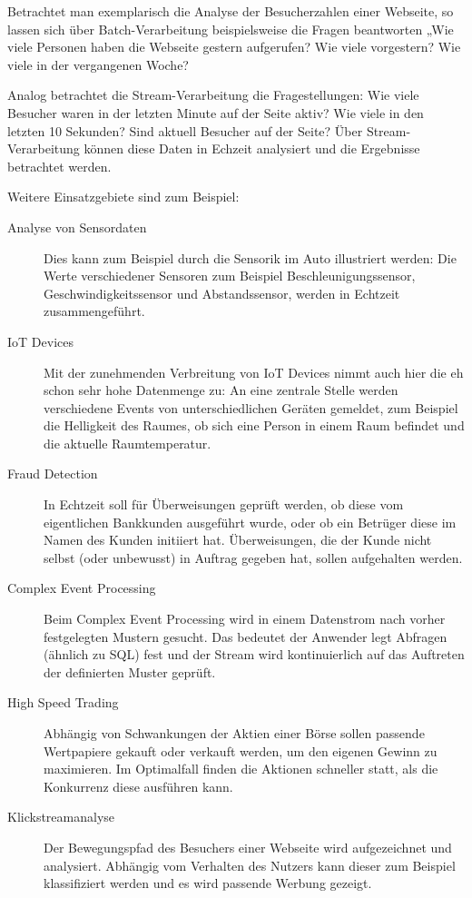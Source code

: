 \documentclass[a4paper,11pt]{scrartcl}
\begin{document}
Betrachtet man exemplarisch die Analyse der Besucherzahlen einer Webseite, so
lassen sich über Batch-Verarbeitung beispielsweise die Fragen beantworten „Wie
viele Personen haben die Webseite gestern aufgerufen? Wie viele vorgestern?
Wie viele in der vergangenen Woche?

Analog betrachtet die Stream-Verarbeitung die Fragestellungen: Wie viele
Besucher waren in der letzten Minute auf der Seite aktiv? Wie viele in den
letzten 10 Sekunden? Sind aktuell Besucher auf der Seite? Über
Stream-Verarbeitung können diese Daten in Echzeit analysiert und die Ergebnisse
betrachtet werden.

Weitere Einsatzgebiete sind zum Beispiel:
\begin{description}
  \item[Analyse von Sensordaten] Dies kann zum Beispiel durch die Sensorik im
    Auto illustriert werden: Die Werte verschiedener Sensoren zum Beispiel
    Beschleunigungssensor, Geschwindigkeitssensor und Abstandssensor, werden in
    Echtzeit zusammengeführt.
  \item[IoT Devices] Mit der zunehmenden Verbreitung von IoT Devices nimmt auch
    hier die eh schon sehr hohe Datenmenge zu: An eine zentrale Stelle werden
    verschiedene Events von unterschiedlichen Geräten gemeldet, zum Beispiel
    die Helligkeit des Raumes, ob sich eine Person in einem Raum befindet und
    die aktuelle Raumtemperatur.
  \item[Fraud Detection] In Echtzeit soll für Überweisungen geprüft werden, ob
    diese vom eigentlichen Bankkunden ausgeführt wurde, oder ob ein Betrüger
    diese im Namen des Kunden initiiert hat. Überweisungen, die der Kunde nicht
    selbst (oder unbewusst) in Auftrag gegeben hat, sollen aufgehalten werden.
  \item[Complex Event Processing] Beim Complex Event Processing wird in einem
    Datenstrom nach vorher festgelegten Mustern gesucht. Das bedeutet der
    Anwender legt Abfragen (ähnlich zu SQL) fest und der Stream wird
    kontinuierlich auf das Auftreten der definierten Muster geprüft.
  \item[High Speed Trading] Abhängig von Schwankungen der Aktien einer Börse
    sollen passende Wertpapiere gekauft oder verkauft werden, um den eigenen
    Gewinn zu maximieren. Im Optimalfall finden die Aktionen schneller statt,
    als die Konkurrenz diese ausführen kann.
  \item[Klickstreamanalyse] Der Bewegungspfad des Besuchers einer Webseite wird
    aufgezeichnet und analysiert. Abhängig vom Verhalten des Nutzers kann
    dieser zum Beispiel klassifiziert werden und es wird passende Werbung
    gezeigt.
\end{description}
\end{document}
